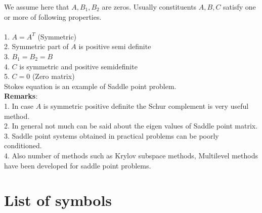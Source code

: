 \documentclass[a4paper,12pt]{book}
\begin{document}
We assume here that $A, B_1, B_2$ are zeros. Usually constituents $A,B,C$ satisfy one or more of following properties.
\\
\\
1. $A = A^T$ (Symmetric)\\
2. Symmetric part of $A$ is positive semi definite\\
3. $B_1 = B_2 = B$\\
4. $C$ is symmetric and positive semidefinite\\
5. $C = 0$ (Zero matrix)\\

Stokes equation is an example of Saddle point problem. \\

\textbf{Remarks}:\\

1. In case $A$ is symmetric positive definite the Schur complement is very useful method.\\

2. In general not much can be said about the eigen values of Saddle point matrix.\\ 

3. Saddle point systems obtained in practical problems can be poorly conditioned.\\

4. Also number of methods such as Krylov subspace methods, Multilevel methods have been developed for saddle point problems.\\

\section{List of symbols} \label{symbol_list}
\end{document}
